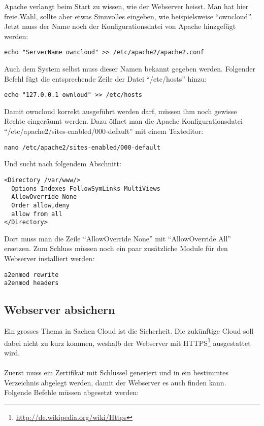Apache verlangt beim Start zu wissen, wie der Webserver heisst. Man hat hier freie Wahl, sollte aber etwas Sinnvolles eingeben, wie beispielsweise ``owncloud''.
\\
Jetzt muss der Name noch der Konfigurationsdatei von Apache hinzgefügt werden:

\begin{lstlisting}
echo "ServerName owncloud" >> /etc/apache2/apache2.conf
\end{lstlisting}

Auch dem System selbst muss dieser Namen bekannt gegeben werden. Folgender Befehl fügt die entsprechende Zeile der Datei ``/etc/hosts'' hinzu:

\begin{lstlisting}
echo "127.0.0.1 ownloud" >> /etc/hosts
\end{lstlisting}


Damit owncloud korrekt ausgeführt werden darf, müssen ihm noch gewisse Rechte eingeräumt werden. Dazu öffnet man die Apache Konfigurationsdatei ``/etc/apache2/sites-enabled/000-default'' mit einem Texteditor:

\begin{lstlisting}
nano /etc/apache2/sites-enabled/000-default
\end{lstlisting}

Und sucht nach folgendem Abschnitt:

\begin{lstlisting}
<Directory /var/www/>
  Options Indexes FollowSymLinks MultiViews
  AllowOverride None
  Order allow,deny
  allow from all
</Directory>
\end{lstlisting}

Dort muss man die Zeile ``AllowOverride None'' mit ``AllowOverride All'' ersetzen. Zum Schluss müssen noch ein paar zusätzliche Module für den Webserver installiert werden:

\begin{lstlisting}
a2enmod rewrite
a2enmod headers
\end{lstlisting}

\subsection{Webserver absichern}
Ein grosses Thema in Sachen Cloud ist die Sicherheit. Die zukünftige Cloud soll dabei nicht zu kurz kommen, weshalb der Webserver mit HTTPS\footnote{\url{http://de.wikipedia.org/wiki/Https}} ausgestattet wird.
\\
\\
Zuerst muss ein Zertifikat mit Schlüssel generiert und in ein bestimmtes Verzeichnis abgelegt werden, damit der Webserver es auch finden kann.
\\
Folgende Befehle müssen abgesetzt werden:

